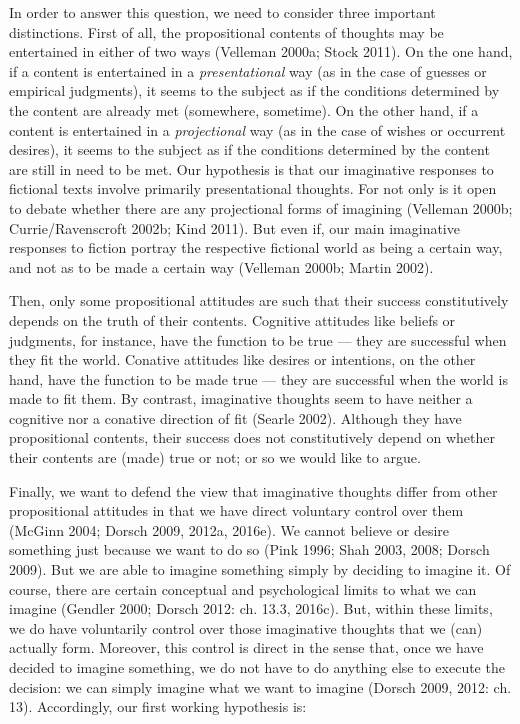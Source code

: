\noindent In order to answer this question, we need to consider three important distinctions. First of all, the propositional contents of thoughts may be entertained in either of two ways (Velleman 2000a; Stock 2011). On the one hand, if a content is entertained in a \emph{presentational} way (as in the case of guesses or empirical judgments), it seems to the subject as if the conditions determined by the content are already met (somewhere, sometime). On the other hand, if a content is entertained in a \emph{projectional} way (as in the case of wishes or occurrent desires), it seems to the subject as if the conditions determined by the content are still in need to be met. Our hypothesis is that our imaginative responses to fictional texts involve primarily presentational thoughts. For not only is it open to debate whether there are any projectional forms of imagining (Velleman 2000b; Currie/Ravenscroft 2002b; Kind 2011). But even if, our main imaginative responses to fiction portray the respective fictional world as being a certain way, and not as to be made a certain way (Velleman 2000b; Martin 2002).

Then, only some propositional attitudes are such that their success constitutively depends on the truth of their contents. Cognitive attitudes like beliefs or judgments, for instance, have the function to be true --- they are successful when they fit the world. Conative attitudes like desires or intentions, on the other hand, have the function to be made true --- they are successful when the world is made to fit them. By contrast, imaginative thoughts seem to have neither a cognitive nor a conative direction of fit (Searle 2002). Although they have propositional contents, their success does not constitutively depend on whether their contents are (made) true or not; or so we would like to argue.

Finally, we want to defend the view that imaginative thoughts differ from other propositional attitudes in that we have direct voluntary control over them (McGinn 2004; Dorsch 2009, 2012a, 2016e). We cannot believe or desire something just because we want to do so (Pink 1996; Shah 2003, 2008; Dorsch 2009). But we are able to imagine something simply by deciding to imagine it. Of course, there are certain conceptual and psychological limits to what we can imagine (Gendler 2000; Dorsch 2012: ch. 13.3, 2016c). But, within these limits, we do have voluntarily control over those imaginative thoughts that we (can) actually form. Moreover, this control is direct in the sense that, once we have decided to imagine something, we do not have to do anything else to execute the decision: we can simply imagine what we want to imagine (Dorsch 2009, 2012: ch. 13). Accordingly, our first working hypothesis is:

